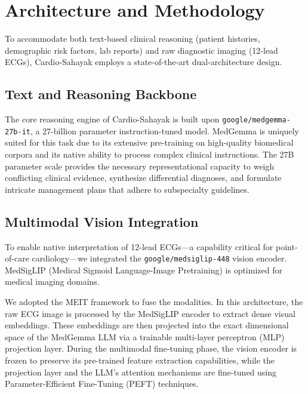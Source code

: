 \documentclass[11pt,a4paper]{article}
\begin{document}
\section{Architecture and Methodology}

To accommodate both text-based clinical reasoning (patient histories, demographic risk factors, lab reports) and raw diagnostic imaging (12-lead ECGs), Cardio-Sahayak employs a state-of-the-art dual-architecture design. 

\subsection{Text and Reasoning Backbone}
The core reasoning engine of Cardio-Sahayak is built upon \texttt{google/medgemma-27b-it}, a 27-billion parameter instruction-tuned model. MedGemma is uniquely suited for this task due to its extensive pre-training on high-quality biomedical corpora and its native ability to process complex clinical instructions. The 27B parameter scale provides the necessary representational capacity to weigh conflicting clinical evidence, synthesize differential diagnoses, and formulate intricate management plans that adhere to subspecialty guidelines.

\subsection{Multimodal Vision Integration}
To enable native interpretation of 12-lead ECGs---a capability critical for point-of-care cardiology---we integrated the \texttt{google/medsiglip-448} vision encoder. MedSigLIP (Medical Sigmoid Language-Image Pretraining) is optimized for medical imaging domains.

We adopted the MEIT framework to fuse the modalities. In this architecture, the raw ECG image is processed by the MedSigLIP encoder to extract dense visual embeddings. These embeddings are then projected into the exact dimensional space of the MedGemma LLM via a trainable multi-layer perceptron (MLP) projection layer. During the multimodal fine-tuning phase, the vision encoder is frozen to preserve its pre-trained feature extraction capabilities, while the projection layer and the LLM's attention mechanisms are fine-tuned using Parameter-Efficient Fine-Tuning (PEFT) techniques.
\end{document}
